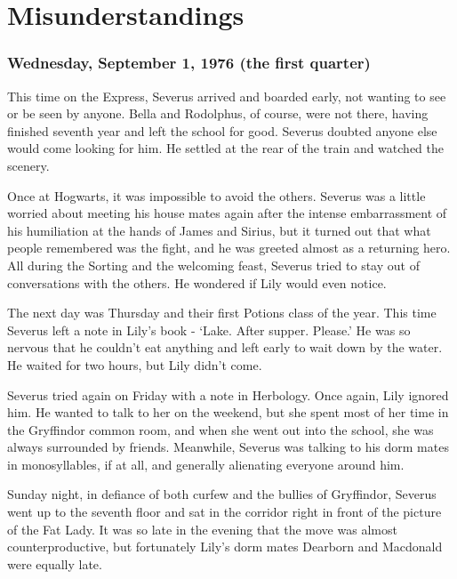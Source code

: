 
\chapter{Misunderstandings}

\subsection{Wednesday, September 1, 1976 (the first quarter)}

This time on the Express, Severus arrived and boarded early, not wanting to see or be seen by anyone. Bella and Rodolphus, of course, were not there, having finished seventh year and left the school for good. Severus doubted anyone else would come looking for him. He settled at the rear of the train and watched the scenery.

Once at Hogwarts, it was impossible to avoid the others. Severus was a little worried about meeting his house mates again after the intense embarrassment of his humiliation at the hands of James and Sirius, but it turned out that what people remembered was the fight, and he was greeted almost as a returning hero. All during the Sorting and the welcoming feast, Severus tried to stay out of conversations with the others. He wondered if Lily would even notice.

The next day was Thursday and their first Potions class of the year. This time Severus left a note in Lily's book - `Lake. After supper. Please.' He was so nervous that he couldn't eat anything and left early to wait down by the water. He waited for two hours, but Lily didn't come.

Severus tried again on Friday with a note in Herbology. Once again, Lily ignored him. He wanted to talk to her on the weekend, but she spent most of her time in the Gryffindor common room, and when she went out into the school, she was always surrounded by friends. Meanwhile, Severus was talking to his dorm mates in monosyllables, if at all, and generally alienating everyone around him.

Sunday night, in defiance of both curfew and the bullies of Gryffindor, Severus went up to the seventh floor and sat in the corridor right in front of the picture of the Fat Lady. It was so late in the evening that the move was almost counterproductive, but fortunately Lily's dorm mates Dearborn and Macdonald were equally late.

